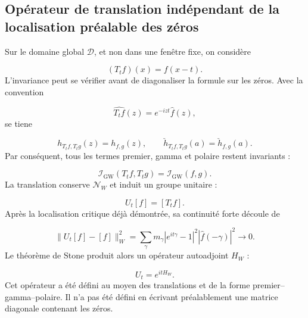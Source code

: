 \subsection{Opérateur de translation indépendant de la localisation préalable des zéros}
Sur le domaine global \(\mathcal D\), et non dans une fenêtre fixe, on considère\par
\[
(T_tf)(x)=f(x-t).
\]
L'invariance peut se vérifier avant de diagonaliser la formule sur les zéros. Avec la convention\par
\[
\widehat{T_tf}(z)
=
e^{-izt}\widehat f(z),
\]
se tiene\par
\[
h_{T_tf,T_tg}(z)=h_{f,g}(z),
\qquad
\check h_{T_tf,T_tg}(a)=\check h_{f,g}(a).
\]
Par conséquent, tous les termes premier, gamma et polaire restent invariants :\par
\[
\mathscr I_{\mathrm{GW}}(T_tf,T_tg)
=
\mathscr I_{\mathrm{GW}}(f,g).
\]
La translation conserve \(\mathcal N_W\) et induit un groupe unitaire :\par
\[
U_t[f]=[T_tf].
\]
Après la localisation critique déjà démontrée, sa continuité forte découle de\par
\[
\|U_t[f]-[f]\|_W^2
=
\sum_\gamma
m_\gamma
\left|e^{it\gamma}-1\right|^2
\left|\widehat f(-\gamma)\right|^2
\longrightarrow0.
\]
Le théorème de Stone produit alors un opérateur autoadjoint \(H_W\) :\par
\[
U_t=e^{itH_W}.
\]
Cet opérateur a été défini au moyen des translations et de la forme premier–gamma–polaire. Il n'a pas été défini en écrivant préalablement une matrice diagonale contenant les zéros.\par
{}

